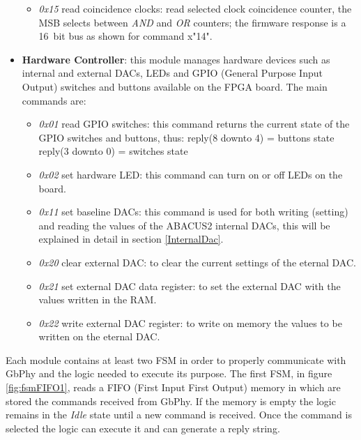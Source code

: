 \begin{itemize}
\begin{itemize}
		\item \textit{0x15} read coincidence clocks: read selected clock coincidence counter, the MSB selects between \textit{AND} and \textit{OR} counters; the firmware response is a 16~bit bus as shown for command x"14".
	\end{itemize}
	
	\item \textbf{Hardware Controller}: this module manages hardware devices such as internal and external DACs, LEDs and GPIO (General Purpose Input Output) switches and buttons available on the FPGA board. The main commands are:
	\begin{itemize}
		\item \textit{0x01} read GPIO switches: this command returns the current state of the GPIO switches and buttons, thus:
		\newline
		reply(8 downto 4) = buttons state
		\newline
		reply(3 downto 0) = switches state
		\item \textit{0x02} set hardware LED: this command can turn on or off LEDs on the board.
		\item \textit{0x11} set baseline DACs: this command is used for both writing (setting) and reading the values of the ABACUS2 internal DACs, this will be explained in detail in section \ref{InternalDac}.
		\item \textit{0x20} clear external DAC: to clear the current settings of the eternal DAC. 
		\item \textit{0x21} set external DAC data register: to set the external DAC with the values written in the RAM.
		\item \textit{0x22} write external DAC register: to write on memory the values to be written on the eternal DAC.
	\end{itemize}  
		
\end{itemize}
\noindent Each module contains at least two FSM in order to properly communicate with GbPhy and the logic needed to execute its purpose. The first FSM, in figure \ref{fig:fsmFIFO1}, reads a FIFO (First Input First Output) memory in which are stored the commands received from GbPhy. If the memory is empty the logic remains in the \textit{Idle} state until a new command is received. Once the command is selected the logic can execute it and can generate a reply string.
